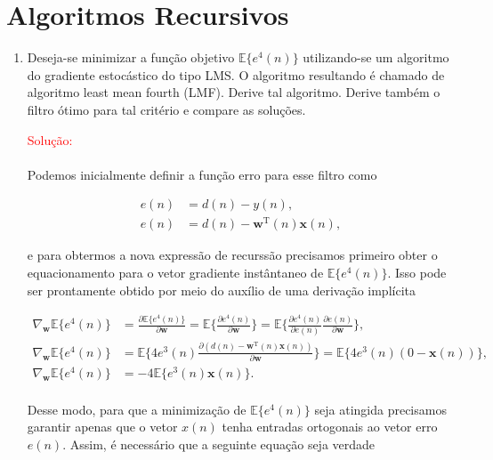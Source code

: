 \documentclass[a4paper,10pt]{article}
\begin{document}
	\newpage
	\section*{Algoritmos Recursivos}
	
		\begin{enumerate}
			
			\item Deseja-se minimizar a função objetivo $\mathbb{E}\{e^{4}(n)\}$ utilizando-se um algoritmo do gradiente estocástico do tipo LMS. O algoritmo resultando é chamado de algoritmo least mean fourth (LMF). Derive tal algoritmo. Derive também o ﬁltro ótimo para tal critério e compare as soluções.
			
				\textcolor{red}{Solução:}
				
				\paragraph{}Podemos inicialmente definir a função erro para esse filtro como
				
				\begin{align}
					e(n) &= d(n) - y(n), \\
					e(n) &= d(n) - \mathbf{w}^{\text{T}}(n)\mathbf{x}(n),
				\end{align}
				
				e para obtermos a nova expressão de recurssão precisamos primeiro obter o equacionamento para o vetor gradiente instântaneo de $\mathbb{E}\{e^{4}(n)\}$. Isso pode ser prontamente obtido por meio do auxílio de uma derivação implícita

				\begin{align}
					\nabla_{\mathbf{w}} \mathbb{E}\{e^{4}(n)\} &= \frac{\partial \mathbb{E}\{e^{4}(n)\}}{\partial \mathbf{w}} = \mathbb{E}\{ \frac{\partial e^{4}(n)}{\partial \mathbf{w}}\} = \mathbb{E}\{ \frac{\partial e^{4}(n)}{\partial e(n)} \frac{\partial e(n) }{\partial \mathbf{w}}\}, \\
					\nabla_{\mathbf{w}} \mathbb{E}\{e^{4}(n)\} &= \mathbb{E}\{4 e^{3}(n) \frac{\partial (d(n) - \mathbf{w}^{\text{T}}(n)\mathbf{x}(n)) }{\partial \mathbf{w}}\} = \mathbb{E}\{4 e^{3}(n) (0 - \mathbf{x}(n))\}, \\
					\nabla_{\mathbf{w}} \mathbb{E}\{e^{4}(n)\} &= - 4 \mathbb{E}\{e^{3}(n) \mathbf{x}(n)\}.
				\end{align}
			
				\paragraph{}Desse modo, para que a minimização de $\mathbb{E}\{e^{4}(n)\}$ seja atingida precisamos garantir apenas que o vetor $x(n)$ tenha entradas ortogonais ao vetor erro $e(n)$. Assim, é necessário que a seguinte equação seja verdade


\end{enumerate}
\end{document}
